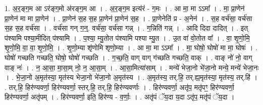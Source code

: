 \documentclass[17pt]{extarticle}
\begin{document}
1. अ॒र॒ङ्ग॒म आ ऽर॑ङ्ग॒मो अ॑रङ्ग॒म आ । . अ॒र॒ङ्ग॒म इत्य॑रं - ग॒मः । . आ मा॒ मा ऽऽमा᳚ । . मा॒ प्रा॒णेन॑ प्रा॒णेन॑ मा मा प्रा॒णेन॑ । . प्रा॒णेन॑ स॒ह स॒ह प्रा॒णेन॑ प्रा॒णेन॑ स॒ह । . प्रा॒णेनेति॑ प्र - अ॒नेन॑ । . स॒ह वर्च॑सा॒ वर्च॑सा स॒ह स॒ह वर्च॑सा । . वर्च॑सा गन् ग॒न्॒. वर्च॑सा॒ वर्च॑सा गन्न् । . ग॒न्निति॑ गन्न् । . आदि दिदा दादित् । . इत् प॑श्यामि पश्या॒मीदित् प॑श्यामि । . प॒श्या॒ म्यु॒तोत प॑श्यामि पश्या म्यु॒त । . उ॒त वा॑ वो॒तोत वा᳚ । . वा॒ शृ॒णो॒मि॒ शृ॒णो॒मि॒ वा॒ वा॒ शृ॒णो॒मि॒ । . शृ॒णो॒म्या शृ॑णोमि शृणो॒म्या । . आ मा॒ मा ऽऽमा᳚ । . मा॒ घोषो॒ घोषो॑ मा मा॒ घोषः॑ । . घोषो॑ गच्छति गच्छति॒ घोषो॒ घोषो॑ गच्छति । . ग॒च्छ॒ति॒ वाग् वाग् ग॑च्छति गच्छति॒ वाक् । . वाङ् नो॑ नो॒ वाग् वाङ् नः॑ । . न॒ आ॒सा॒ मा॒सा॒म् नो॒ न॒ आ॒सा॒म् । . आ॒सा॒मित्या॑साम् । . मन्ये॑ भेजा॒नो भे॑जा॒नो मन्ये॒ मन्ये॑ भेजा॒नः । . भे॒जा॒नो अ॒मृत॑स्या॒ मृत॑स्य भेजा॒नो भे॑जा॒नो अ॒मृत॑स्य । . अ॒मृत॑स्य॒ तर्.हि॒ तर्.ह्य॒मृत॑स्या॒ मृत॑स्य॒ तर्.हि॑ । . तर्.हि॒ हिर॑ण्यवर्णा॒ हिर॑ण्यवर्णा॒ स्तर्.हि॒ तर्.हि॒ हिर॑ण्यवर्णाः । . हिर॑ण्यवर्णा॒ अतृ॑प॒ मतृ॑पꣳ॒॒ हिर॑ण्यवर्णा॒ हिर॑ण्यवर्णा॒ अतृ॑पम् । . हिर॑ण्यवर्णा॒ इति॒ हिर॑ण्य - व॒र्णाः॒ । . अतृ॑पं ॅय॒दा य॒दा ऽतृ॑प॒ मतृ॑पं ॅय॒दा । \newline
\end{document}
